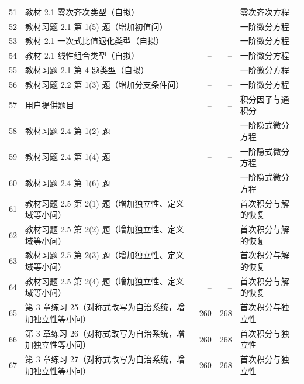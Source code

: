 \begin{longtable}{r p{.30\linewidth}rr p{.33\linewidth}}
51 & 教材 2.1 零次齐次类型（自拟） & -- & -- & 零次齐次方程\\
52 & 教材习题 2.1 第 1(5) 题（增加初值问） & -- & -- & 一阶微分方程\\
53 & 教材 2.1 一次式比值退化类型（自拟） & -- & -- & 一阶微分方程\\
54 & 教材 2.1 线性组合类型（自拟） & -- & -- & 一阶微分方程\\
55 & 教材习题 2.1 第 4 题类型（自拟） & -- & -- & 一阶微分方程\\
56 & 教材习题 2.2 第 1(3) 题（增加分支条件问） & -- & -- & 一阶微分方程\\
57 & 用户提供题目 & -- & -- & 积分因子与通积分\\
58 & 教材习题 2.4 第 1(2) 题 & -- & -- & 一阶隐式微分方程\\
59 & 教材习题 2.4 第 1(4) 题 & -- & -- & 一阶隐式微分方程\\
60 & 教材习题 2.4 第 1(6) 题 & -- & -- & 一阶隐式微分方程\\
61 & 教材习题 2.5 第 2(1) 题（增加独立性、定义域等小问） & -- & -- & 首次积分与解的恢复\\
62 & 教材习题 2.5 第 2(2) 题（增加独立性、定义域等小问） & -- & -- & 首次积分与解的恢复\\
63 & 教材习题 2.5 第 2(3) 题（增加独立性、定义域等小问） & -- & -- & 首次积分与解的恢复\\
64 & 教材习题 2.5 第 2(4) 题（增加独立性、定义域等小问） & -- & -- & 首次积分与解的恢复\\
65 & 第 3 章练习 25（对称式改写为自治系统，增加独立性等小问） & 260 & 268 & 首次积分与独立性\\
66 & 第 3 章练习 26（对称式改写为自治系统，增加独立性等小问） & 260 & 268 & 首次积分与独立性\\
67 & 第 3 章练习 27（对称式改写为自治系统，增加独立性等小问） & 260 & 268 & 首次积分与独立性\\
\bottomrule\end{longtable}